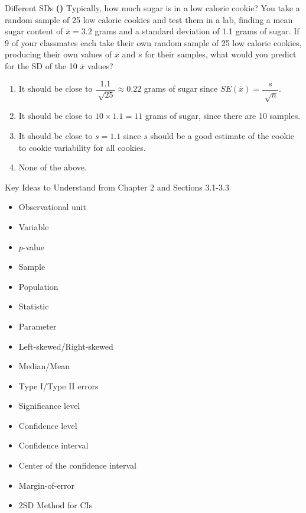 \documentclass[13pt]{beamer}
\newcounter{count}
\newcommand{\question}{\textbf{(\decimal{count})} \stepcounter{count}}
\begin{document}
\begin{frame}{Different SDs}
\question Typically, how much sugar is in a low calorie cookie? You take a random sample of 25 low calorie cookies and test them in a lab, finding a mean sugar content of $\overline{x}=3.2$ grams and a standard deviation of 1.1 grams of sugar. If 9 of your classmates each take their own random sample of 25 low calorie cookies, producing their own values of $\overline{x}$ and $s$ for their samples, what would you predict for the SD of the 10 $\overline{x}$ values?
\begin{enumerate}[A]
   \item It should be close to $\dfrac{1.1}{\sqrt[]{25}}\approx 0.22$ grams of sugar since $SE(\overline{x})=\dfrac{s}{\sqrt[]{n}}$. %
   \item It should be close to $10\times 1.1 = 11$ grams of sugar, since there are 10 samples.
   \item It should be close to $s=1.1$ since $s$ should be a good estimate of the cookie to cookie variability for all cookies.
   \item None of the above.
\end{enumerate}
\end{frame}

\begin{frame}{Key Ideas to Understand from Chapter 2 and Sections 3.1-3.3}
\begin{multicols}{2}
\begin{itemize}
	\item Observational unit
    \item Variable
	\item $p$-value
	\item Sample
    \item Population
    \item Statistic
    \item Parameter
    \item Left-skewed/Right-skewed
    \item Median/Mean
    \item Type I/Type II errors
    \item Significance level
    \item Confidence level
    \item Confidence interval
    \item Center of the confidence interval
    \item Margin-of-error
    \item 2SD Method for CIs
\end{itemize}
\end{multicols}
\end{frame}
\end{document}
